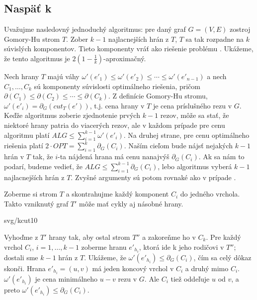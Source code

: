 \subsection*{Naspäť k \kcut}

Uvažujme nasledovný jednoduchý algoritmus: pre daný graf $G=(V,E)$ zostroj Gomory-Hu strom $T$.
Zober $k-1$ najlacnejších hrán z $T$, $T$ sa tak rozpadne na $k$ súvislých komponentov. Tieto
komponenty vráť ako riešenie problému \kcut.
Ukážeme, že tento algoritmus je $2\left(1-\frac{1}{k}\right)$-aproximačný.

Nech hrany $T$ majú váhy $\omega'(e'_1)\le\omega'(e'_2)\le\cdots\le\omega'(e'_{n-1})$ a nech
$C_1,\ldots,C_k$ sú komponenty súvislosti optimálneho riešenia, pričom 
$\partial(C_1)\le\partial(C_2)\le\cdots\le\partial(C_k)$.
Z definície Gomory-Hu stromu, $\omega'(e'_i)=\partial_G(cut_T(e'))$, t.j. cena hrany v $T$ je cena
príslušného rezu v $G$. Keďže
algoritmus zoberie zjednotenie prvých $k-1$ rezov, môže sa stať, že niektoré hrany patria do viacerých
rezov, ale v každom prípade pre cenu algoritmu platí $ALG\le\sum_{i=1}^{k-1}\omega'(e'_i)$.
Na druhej strane, pre cenu optimálneho riešenia platí $2\cdot OPT=\sum_{i=1}^k\partial_G(C_i)$. Naším 
cieľom bude nájsť nejakých $k-1$ hrán v $T$ tak, že $i$-ta nájdená hrana má cenu nanajvýš $\partial_G(C_i)$.
Ak sa nám to podarí, budeme vedieť, že $ALG\le\sum_{i=1}^{k-1}\partial_G(C_i)$, lebo algoritmus
vyberá $k-1$ najlacnejších hrán z $T$. Zvyšné argumenty sú potom rovnaké ako v prípade \multiwaycut.

Zoberme si strom $T$ a skontrahujme každý komponent $C_i$ do jedného vrchola. Takto vzniknutý graf $T'$ môže mať 
cykly aj násobné hrany.

\begin{myfig}{0.9\textwidth}{svg/kcut10}
\end{myfig}

Vyhoďme z $T'$  hrany tak, aby ostal strom $T''$  a zakoreňme ho v $C_k$.
Pre každý vrchol $C_i$, $i=1,\ldots,k-1$ zoberme hranu $e'_{h_i}$, 
ktorá ide k jeho rodičovi v $T''$; dostali sme $k-1$ hrán z $T$. Ukážeme, že $\omega'(e'_{h_i})\le\partial_G(C_i)$,
čím sa celý dôkaz skonči.
Hrana $e'_{h_i}=(u,v)$ má jeden koncový vrchol v $C_i$ a druhý mimo $C_i$. $\omega'(e'_{h_i})$ je cena
minimálneho $u-v$ rezu v $G$. Ale $C_i$ tiež oddeľuje $u$ od $v$, a preto $\omega'(e'_{h_i})\le\partial_G(C_i)$.


